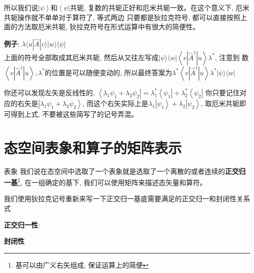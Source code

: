 所以我们说$\left|\psi\right\rangle$和$\left\langle \psi \right|$共轭, 复数的共轭正好和厄米共轭一致。在这个意义下, 厄米共轭操作就不单单对于算符了, 等式两边
只要都是狄拉克符号, 都可以直接按照上面的方法取厄米共轭, 狄拉克符号在形式运算中有很大的简便性。
\begin{thinknote}
    \textbf{例子}:  $\lambda\langle u|\hat{A}| v\rangle|w\rangle\langle\psi|$\\
    上面的符号全部取成其厄米共轭, 然后从又往左写成$|\psi\rangle\langle w|\left\langle v\left|\hat{A}^{\dagger}\right| u\right\rangle \lambda^{*}$, 注意到
    数$\left\langle v\left|\hat{A}^{\dagger}\right| u\right\rangle,\lambda^{*}$的位置是可以随便变动的, 所以最终答案为$\lambda^{*}\left\langle v\left|\hat{A}^{\dagger}\right| u\right\rangle\lambda^{*}|\psi\rangle\langle w|$
\end{thinknote}
你还可以发现左矢是反线性的, $\left\langle\lambda_1\psi_1+\lambda_2\psi_2\right| =\lambda_1^*\left\langle\psi_1\right|+\lambda_2^*\left\langle\psi_2\right|$
你只要记住对应的右矢是$\left|\lambda_1\psi_1+\lambda_2\psi_2\right\rangle$, 而这个右矢实际上是$\lambda_1\left|\psi_1\right\rangle+\lambda_2\left|\psi_2\right\rangle $, 取厄米共轭即可得到上式, 不要被这些简写了的记号弄混。

\section{态空间表象和算子的矩阵表示}
\begin{define}{表象}
    我们说在态空间中选取了一个表象就是选取了一个离散的或者连续的\textbf{正交归一基}\footnote[1]{基可以由广义右矢组成, 保证运算上的简便}, 在一组确定的基下, 我们可以使用矩阵来描述态矢量和算符。
\end{define}
我们使用狄拉克记号重新来写一下正交归一基底需要满足的正交归一和封闭性关系式

\textbf{正交归一性}:
\begin{lequation}
    \label{eq:B.12}
\end{lequation}

\textbf{封闭性}
\begin{lequation}
    \label{eq:B.13}
\end{lequation}

